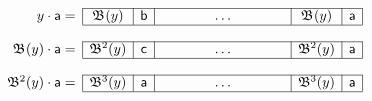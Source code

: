 \documentclass[11pt]{article}
\begin{document}
\TeXtoEPS
\(
\begin{array}{r@{}ccccc}
\cline{2-6}
  \multicolumn{1}{r|}{y \cdot \word{a} =}
& \multicolumn{1}{c|}{\Border{}{y}}
& \multicolumn{1}{c|}{\word{b}}
& \phantom{HHHH}\ldots\phantom{HHHH}
& \multicolumn{1}{|c|}{\Border{}{y}}
& \multicolumn{1}{c|}{\word{a}}\\
\cline{2-6}
&&&&&\\
\cline{2-6}
  \multicolumn{1}{r|}{\Border{}{y} \cdot \word{a} =}
& \multicolumn{1}{c|}{\Border{2}{y}}
& \multicolumn{1}{c|}{\word{c}}
& \ldots
& \multicolumn{1}{|c|}{\Border{2}{y}}
& \multicolumn{1}{c|}{\word{a}}\\
\cline{2-6}
&&&&&\\
\cline{2-6}
  \multicolumn{1}{r|}{\Border{2}{y} \cdot \word{a} =}
& \multicolumn{1}{c|}{\Border{3}{y}}
& \multicolumn{1}{c|}{\word{a}}
& \ldots
& \multicolumn{1}{|c|}{\Border{3}{y}}
& \multicolumn{1}{c|}{\word{a}}\\
\cline{2-6}
\end{array}
\)
\endTeXtoEPS
\end{document}
